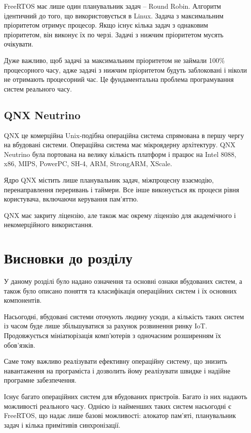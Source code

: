 \documentclass[oneside,14pt,a4paper,final]{myextreport}
\newcommand{\specialsection}[1]{\section*{#1}\addcontentsline{toc}{section}{#1}}
\newcommand{\chapterconslusions}{
  \clearpage
  \specialsection{Висновки до розділу \thechapter}
}
\begin{document}
FreeRTOS має лише один планувальник задач -- Round Robin. Алгоритм ідентичний до того, що використовується в Linux. Задача з максимальним пріоритетом отримує процесор. Якщо існує кілька задач з однаковим пріоритетом, він виконує їх по черзі. Задачі з нижчим пріоритетом мусять очікувати.

Дуже важливо, щоб задачі за максимальним пріоритетом не займали 100\% процесорного часу, адже задачі з нижчим пріоритетом будуть заблоковані і ніколи не отримають процесорний час. Це фундаментальна проблема програмування систем реального часу.

\subsection{QNX Neutrino}

QNX\cite{qnx} це комерційна Unix-подібна операційна система спрямована в першу чергу на вбудовані системи. Операційна система має мікроядерну архітектуру. QNX Neutrino була портована на велику кількість платформ і працює на Intel 8088, x86, MIPS, PowerPC, SH-4, ARM, StrongARM, XScale.

Ядро QNX містить лише планувальник задач, міжпроцесну взаємодію, перенаправлення переривань і таймери. Все інше виконується як процеси рівня користувача, включаючи керування пам'яттю.

QNX має закриту ліцензію, але також має окрему ліцензію для академічного і некомерційного використання\cite{qnx:noncommercial}.

\chapterconslusions{}

У даному розділі було надано означення та основні ознаки вбудованих систем, а також було описано поняття та класифікація операційних систем і їх основних компонентів.

Насьогодні, вбудовані системи оточують людину усюди, а кількість таких систем із часом буде лише збільшуватися за рахунок розвинення ринку \acs{IoT}. Продовжується мініатюрізація комп'ютерів з одночасним розширенням їх обов'язків.

Саме тому важливо реалізувати ефективну операційну систему, що знизить навантаження на програміста і дозволить йому реалізувати швидке і надійне програмне забезпечення.

Існує багато операційних систем для вбудованих пристроїв. Багато із них надають можливості реального часу. Однією із найменших таких систем насьогодні є FreeRTOS, що надає лише базові можливості: алокатор пам'яті, планувальник задач і кілька примітивів синхронізації.
\end{document}
